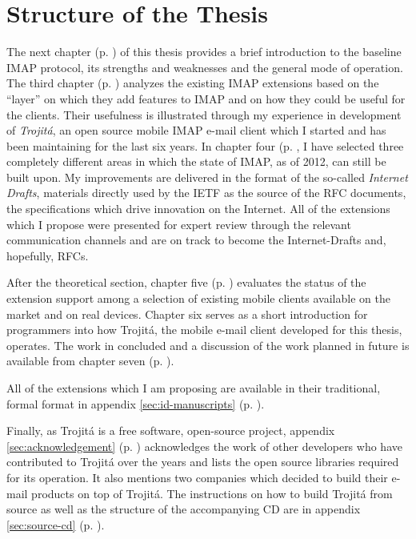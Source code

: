 \documentclass[trojita]{subfiles}
\begin{document}
\section{Structure of the Thesis}

The next chapter (p. \pageref{sec:imap-protocol}) of this thesis provides a brief introduction to the baseline IMAP
protocol, its strengths and weaknesses and the general mode of operation.  The third chapter (p.
\pageref{sec:imap-extensions}) analyzes the existing IMAP extensions based on the ``layer'' on which they add features
to IMAP and on how they could be useful for the clients.  Their usefulness is illustrated through my experience in
development of {\em Trojitá}, an open source mobile IMAP e-mail client which I started and has been maintaining for the
last six years.  In chapter four (p.  \pageref{sec:proposed-extensions}, I have selected three completely different
areas in which the state of IMAP, as of 2012, can still be built upon.  My improvements are delivered in the format of
the so-called {\em Internet Drafts}, materials directly used by the IETF as the source of the RFC documents, the
specifications which drive innovation on the Internet.  All of the extensions which I propose were presented for expert
review through the relevant communication channels and are on track to become the Internet-Drafts and, hopefully, RFCs.

After the theoretical section, chapter five (p. \pageref{sec:mobile-imap}) evaluates the status of the extension support
among a selection of existing mobile clients available on the market and on real devices.  Chapter six serves as a short
introduction for programmers into how Trojitá, the mobile e-mail client developed for this thesis, operates.  The work
in concluded and a discussion of the work planned in future is available from chapter seven (p.
\pageref{sec:conclusion}).

All of the extensions which I am proposing are available in their traditional, formal format in appendix \ref{sec:id-manuscripts}
(p. \pageref{sec:id-manuscripts}).

Finally, as Trojitá is a free software, open-source project, appendix \ref{sec:acknowledgement} (p.
\pageref{sec:acknowledgement}) acknowledges the work of other developers who have contributed to Trojitá over the years
and lists the open source libraries required for its operation.  It also mentions two companies which decided to build
their e-mail products on top of Trojitá.  The instructions on how to build Trojitá from source as well as the structure
of the accompanying CD are in appendix \ref{sec:source-cd} (p. \pageref{sec:source-cd}).
\end{document}
